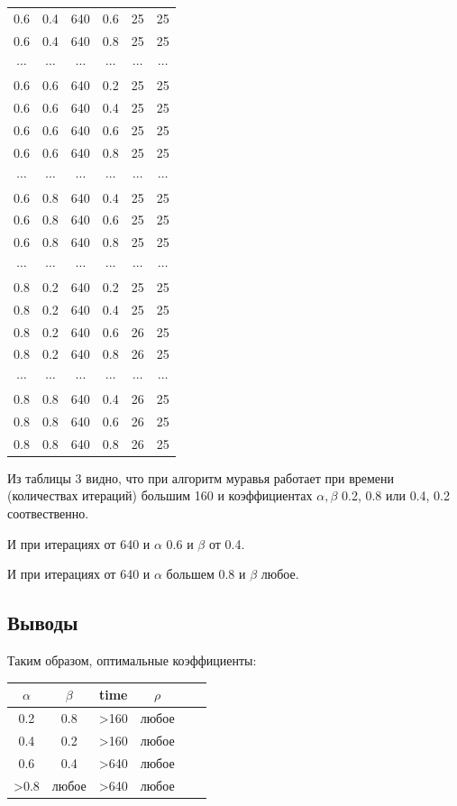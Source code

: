 \documentclass[a4paper,14pt]{article} %
\begin{document}
\begin{tabular}{|c|c|c|c|c|c|}
0.6&0.4&640&0.6&25&25\\
0.6&0.4&640&0.8&25&25\\
$\cdots$&$\cdots$&$\cdots$&$\cdots$&$\cdots$&$\cdots$\\
0.6&0.6&640&0.2&25&25\\
0.6&0.6&640&0.4&25&25\\
0.6&0.6&640&0.6&25&25\\
0.6&0.6&640&0.8&25&25\\
$\cdots$&$\cdots$&$\cdots$&$\cdots$&$\cdots$&$\cdots$\\
0.6&0.8&640&0.4&25&25\\
0.6&0.8&640&0.6&25&25\\
0.6&0.8&640&0.8&25&25\\
$\cdots$&$\cdots$&$\cdots$&$\cdots$&$\cdots$&$\cdots$\\
0.8&0.2&640&0.2&25&25\\
0.8&0.2&640&0.4&25&25\\
0.8&0.2&640&0.6&26&25\\
0.8&0.2&640&0.8&26&25\\
$\cdots$&$\cdots$&$\cdots$&$\cdots$&$\cdots$&$\cdots$\\
0.8&0.8&640&0.4&26&25\\
0.8&0.8&640&0.6&26&25\\
0.8&0.8&640&0.8&26&25\\	
\hline
\end{tabular}

Из таблицы 3 видно, что при алгоритм муравья работает при времени (количествах итераций) большим 160 и коэффициентах $\alpha, \beta $ 0.2, 0.8 или 0.4, 0.2 соотвественно. 

И при итерациях от 640 и $\alpha$ 0.6 и $\beta$ от 0.4. 
 
И при итерациях от 640 и $\alpha$ большем 0.8 и $\beta$ любое. 
 
	\subsection{Выводы}
	\hfill
	
	Таким образом, оптимальные коэффициенты:
	
	\begin{tabular}{|c|c|c|c|c|c|}
	\hline
	$\alpha$&$\beta$&time&$\rho$ \\
	\hline	
	0.2&0.8&>160& любое\\
	0.4&0.2&>160& любое\\
	0.6&0.4&>640& любое\\
	>0.8&любое&>640& любое\\
	\hline
	\end{tabular}
	
\end{document}
